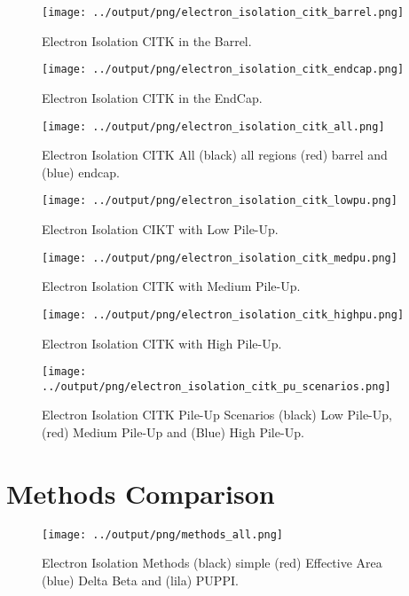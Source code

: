 \documentclass[11pt]{book}
\begin{document}
\begin{figure}[htbp]
\centering
\texttt{[image: ../output/png/electron\_isolation\_citk\_barrel.png]}
\caption{Electron Isolation CITK in the Barrel.}
\label{fig:electron_isolation_citk_barrel}
\end{figure}

\begin{figure}[htbp]
\centering
\texttt{[image: ../output/png/electron\_isolation\_citk\_endcap.png]}
\caption{Electron Isolation CITK in the EndCap.}
\label{fig:electron_isolation_citk_endcap}
\end{figure}

\begin{figure}[htbp]
\centering
\texttt{[image: ../output/png/electron\_isolation\_citk\_all.png]}
\caption{Electron Isolation CITK All (black) all regions (red) barrel and (blue) endcap.}
\label{fig:electron_isolation_citk_all}
\end{figure}


\begin{figure}[htbp]
\centering
\texttt{[image: ../output/png/electron\_isolation\_citk\_lowpu.png]}
\caption{Electron Isolation CIKT with Low Pile-Up.}
\label{fig:electron_isolation_citk_lowpu}
\end{figure}

\begin{figure}[htbp]
\centering
\texttt{[image: ../output/png/electron\_isolation\_citk\_medpu.png]}
\caption{Electron Isolation CITK with Medium Pile-Up.}
\label{fig:electron_isolation_citk_medpu}
\end{figure}

\begin{figure}[htbp]
\centering
\texttt{[image: ../output/png/electron\_isolation\_citk\_highpu.png]}
\caption{Electron Isolation CITK with High Pile-Up.}
\label{fig:electron_isolation_citk_highpu}
\end{figure}

\begin{figure}[htbp]
\centering
\texttt{[image: ../output/png/electron\_isolation\_citk\_pu\_scenarios.png]}
\caption{Electron Isolation CITK Pile-Up Scenarios (black) Low Pile-Up, (red) Medium Pile-Up and (Blue) High Pile-Up.}
\label{fig:electron_isolation_citk_pu_scenarios}
\end{figure}
\clearpage


\chapter{Methods Comparison}
\begin{figure}[ht]
\centering
\texttt{[image: ../output/png/methods\_all.png]}
\caption{Electron Isolation Methods (black) simple (red) Effective Area (blue) Delta Beta and (lila) PUPPI.}
\label{fig:methods_all}
\end{figure}
\end{document}
